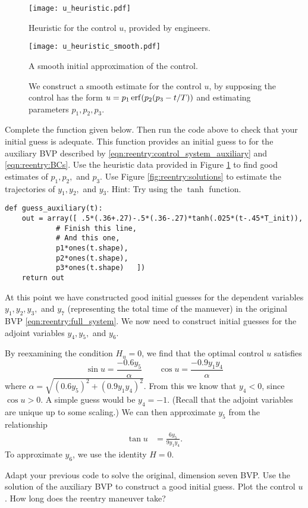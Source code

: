 \begin{figure}
\begin{minipage}[b]{.47\linewidth}
\centering
\texttt{[image: u\_heuristic.pdf]}
\caption*{Heuristic for the control $u$, provided by engineers. }
\end{minipage}
\hspace{0.5cm}
\begin{minipage}[b]{0.47\linewidth}
\centering
\texttt{[image: u\_heuristic\_smooth.pdf]}
\caption*{A smooth initial approximation of the control.}
\end{minipage}
\caption{We construct a smooth estimate for the control $u$, by supposing the control has the form
$u = p_1\operatorname{erf}(p_2(p_3-t/T))$ and estimating parameters $p_1, p_2, p_3$.}
\label{fig:reentry:estimate_u}
\end{figure}


\begin{problem}
	Complete the function  given below. Then run the code above to check that your initial guess is adequate.
	This function provides an initial guess to  for the auxiliary BVP described by  \eqref{eqn:reentry:control_system_auxiliary} and \eqref{eqn:reentry:BCs}.
	Use the heuristic data provided in Figure \ref{fig:reentry:estimate_u} to find good estimates of $p_1, p_2,$ and $p_3$.
	Use Figure \ref{fig:reentry:solutions} to estimate the trajectories of $y_1, y_2,$ and $y_3$. Hint: Try using the $\tanh$ function.

\begin{lstlisting}
def guess_auxiliary(t):
	out = array([ .5*(.36+.27)-.5*(.36-.27)*tanh(.025*(t-.45*T_init)),
			# Finish this line,
			# And this one,
			p1*ones(t.shape),
			p2*ones(t.shape),
			p3*ones(t.shape)   ])
	return out
\end{lstlisting}
	\label{prob:reentry:guess}
\end{problem}

At this point we have constructed good initial guesses for the dependent variables $y_1,y_2, y_3,$ and $y_7$ (representing the total time of the manuever) in the original BVP \eqref{eqn:reentry:full_system}.
We now need to construct initial guesses for the adjoint variables $y_4, y_5,$ and $y_6$.

By reexamining the condition $H_u = 0$, we find that the optimal control $u$ satisfies
\[
\sin u = \frac{-0.6 y_5}{\alpha} \qquad \cos u  = \frac{-0.9 y_1y_4}{\alpha}
\]
where $\alpha = \sqrt{(0.6y_5)^2 + (0.9y_1y_4)^2}$.
From this we know that $y_4 <0$, since $\cos u >0$. A simple guess would be $y_4 = -1$.
(Recall that the adjoint variables are unique up to some scaling.)
We can then approximate $y_5$ from the relationship
\begin{align*}
\tan u &= \frac{6y_5}{9y_1y_4}.
\end{align*}
To approximate $y_6$, we use the identity $H = 0$.


\begin{problem}
	Adapt your previous code to solve the original, dimension seven BVP.
	Use the solution of the auxiliary BVP to construct a good initial guess.
	Plot the control $u$. How long does the reentry maneuver take?
\end{problem}
